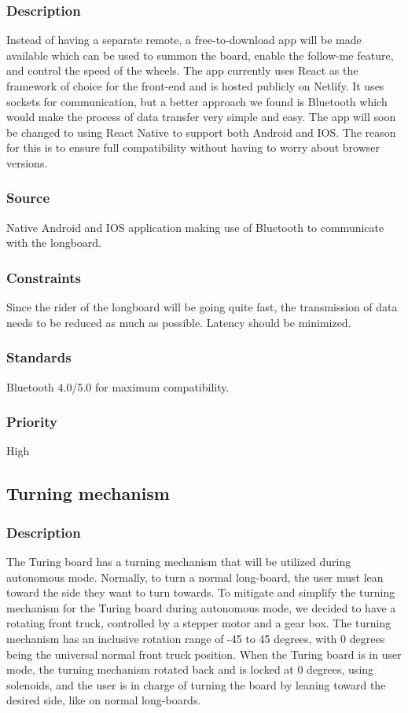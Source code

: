 \subsubsection{Description}
Instead of having a separate remote, a free-to-download app will be made available which can be used to summon the board, enable the follow-me feature, and control the speed of the wheels. The app currently uses React as the framework of choice for the front-end and is hosted publicly on Netlify. It uses sockets for communication, but a better approach we found is Bluetooth which would make the process of data transfer very simple and easy. The app  will soon be changed to using React Native to support both Android and IOS. The reason for this is to ensure full compatibility without having to worry about browser versions.
\subsubsection{Source}
Native Android and IOS application making use of Bluetooth to communicate with the longboard.
\subsubsection{Constraints}
Since the rider of the longboard will be going quite fast, the transmission of data needs to be reduced as much as possible. Latency should be minimized.
\subsubsection{Standards}
Bluetooth 4.0/5.0 for maximum compatibility.
\subsubsection{Priority}
High
\subsection{Turning mechanism}
\subsubsection{Description}
The Turing board has a turning mechanism that will be utilized during autonomous mode. Normally, to turn a normal long-board, the user must lean toward the side they want to turn towards. To mitigate and simplify the turning mechanism for the Turing board during autonomous mode, we decided to have a rotating front truck, controlled by a stepper motor and a gear box. The turning mechanism has an inclusive rotation range of -45 to 45 degrees, with 0 degrees being the universal normal front truck position. When the Turing board is in user mode, the turning mechanism rotated back and is locked at 0 degrees, using solenoids, and the user is in charge of turning the board by leaning toward the desired side, like on normal long-boards. 
